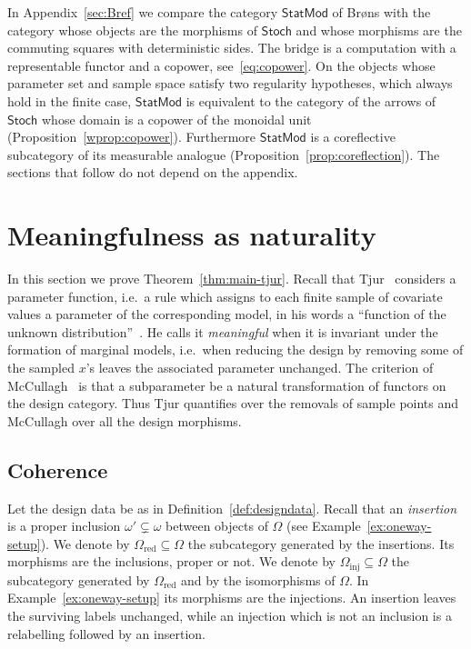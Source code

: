 \documentclass[11pt,a4paper]{article}
\theoremstyle{plain}
\theoremstyle{definition}
\theoremstyle{remark}
\newcommand{\cat}[1]{\mathsf{#1}}
\newcommand{\catO}{\cat{\Omega}}
\newcommand{\Stoch}{\cat{Stoch}}
\newcommand{\StatMod}{\cat{StatMod}}
\begin{document}
In Appendix~\ref{sec:Bref} we compare the category $\StatMod$ of Br\o ns with
the category whose objects are the morphisms of $\Stoch$ and whose morphisms
are the commuting squares with deterministic sides. The bridge is a computation
with a representable functor and a copower, see~\eqref{eq:copower}. On the
objects whose parameter set and sample space satisfy two regularity
hypotheses, which always hold in the finite case, $\StatMod$ is equivalent to
the category of the arrows of $\Stoch$ whose domain is a copower of the
monoidal unit (Proposition~\ref{wprop:copower}). Furthermore $\StatMod$ is a
coreflective subcategory of its measurable analogue
(Proposition~\ref{prop:coreflection}). The sections that follow do not depend
on the appendix.
\section{Meaningfulness as naturality}\label{sec:meaningful}

In this section we prove Theorem~\ref{thm:main-tjur}. Recall that
Tjur~\cite{tjur_discussion_2002} considers a parameter function, i.e.\ a rule
which assigns to each finite sample of covariate values a parameter of the
corresponding model, in his words a ``function of the unknown
distribution''~\cite[p.~1299]{tjur_discussion_2002}. He calls it
\emph{meaningful} when it is invariant under the formation of marginal models,
i.e.\ when reducing the design by removing some of the sampled $x$'s leaves
the associated parameter unchanged. The criterion of
McCullagh~\cite[\S4.5]{mccullagh_what_2002} is that a subparameter be a natural
transformation of functors on the design category. Thus Tjur quantifies over
the removals of sample points and McCullagh over all the design morphisms.

\subsection{Coherence}

Let the design data be as in Definition~\ref{def:designdata}. Recall that an
\emph{insertion} is a proper inclusion $\omega' \subsetneq \omega$ between
objects of $\catO$ (see Example~\ref{ex:oneway-setup}). We denote by
$\catO_{\mathrm{red}} \subseteq \catO$ the subcategory generated by the
insertions. Its morphisms are the inclusions, proper or not. We denote by
$\catO_{\mathrm{inj}} \subseteq \catO$ the subcategory generated by
$\catO_{\mathrm{red}}$ and by the isomorphisms of $\catO$. In
Example~\ref{ex:oneway-setup} its morphisms are the injections. An insertion
leaves the surviving labels unchanged, while an injection which is not an
inclusion is a relabelling followed by an insertion.
\end{document}
